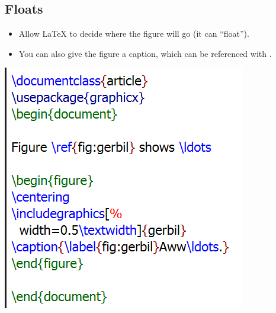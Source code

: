 \documentclass[aspectratio=169]{beamer}
\begin{document}
\subsection[fragile]{Floats}
\begin{frame}{\insertsubsection}
\begin{itemize}
\item Allow \LaTeX{} to decide where the figure will go (it can ``float'').
\item You can also give the figure a caption, which can be referenced with
.
\end{itemize}
\begin{minipage}{0.55\linewidth}
    \includegraphics[width=0.5\linewidth]{figs/float_basic.png}
\end{minipage}
\begin{minipage}{0.35\linewidth}

\end{minipage}
\end{frame}
\end{document}
